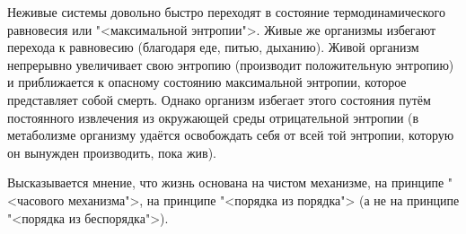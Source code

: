 \documentclass[exam_answers.tex]{subfiles}
\begin{document}
Неживые системы довольно быстро переходят в состояние термодинамического равновесия или "<максимальной энтропии">.
Живые же организмы избегают перехода к равновесию (благодаря еде, питью, дыханию).
Живой организм непрерывно увеличивает свою энтропию (производит положительную энтропию) и приближается к опасному состоянию максимальной энтропии, которое представляет собой смерть.
Однако организм избегает этого состояния путём постоянного извлечения из окружающей среды отрицательной энтропии (в метаболизме организму удаётся освобождать себя от всей той энтропии, которую он вынужден производить, пока жив).

Высказывается мнение, что жизнь основана на чистом механизме, на принципе "<часового механизма">, на принципе "<порядка из порядка"> (а не на принципе "<порядка из беспорядка">).
\end{document}
